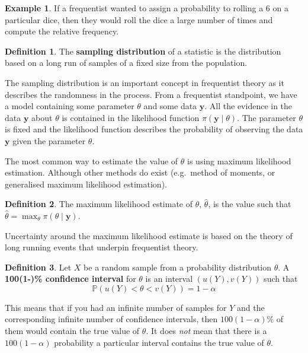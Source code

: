 \documentclass[
]{book}
\theoremstyle{definition}
\newtheorem{definition}{Definition}[chapter]
\theoremstyle{definition}
\newtheorem{example}{Example}[chapter]
\theoremstyle{definition}
\theoremstyle{definition}
\theoremstyle{remark}
\begin{document}
\begin{example}
If a frequentist wanted to assign a probability to rolling a 6 on a particular dice, then they would roll the dice a large number of times and compute the relative frequency.
\end{example}

\begin{definition}
The \textbf{sampling distribution} of a statistic is the distribution based on a long run of samples of a fixed size from the population.
\end{definition}

The sampling distribution is an important concept in frequentist theory as it describes the randomness in the process. From a frequentist standpoint, we have a model containing some parameter \(\theta\) and some data \(\boldsymbol{y}\). All the evidence in the data \(\boldsymbol{y}\) about \(\theta\) is contained in the likelihood function \(\pi(\boldsymbol{y} \mid \theta)\). The parameter \(\theta\) is fixed and the likelihood function describes the probability of observing the data \(\boldsymbol{y}\) given the parameter \(\theta\).

The most common way to estimate the value of \(\theta\) is using maximum likelihood estimation. Although other methods do exist (e.g.~method of moments, or generalised maximum likelihood estimation).

\begin{definition}
The maximum likelihood estimate of \(\theta\), \(\hat{\theta}\), is the value such that \(\hat{\theta} = \max_{\theta} \pi(\theta \mid \boldsymbol{y})\).
\end{definition}

Uncertainty around the maximum likelihood estimate is based on the theory of long running events that underpin frequentist theory.

\begin{definition}
Let \(X\) be a random sample from a probability distribution \(\theta\). A \textbf{100(1-\alpha)\% confidence interval} for \(\theta\) is an interval \((u(Y), v(Y))\) such that
\[
\mathbb{P}(u(Y) < \theta < v(Y)) = 1-\alpha
\]
\end{definition}

This means that if you had an infinite number of samples for \(Y\) and the corresponding infinite number of confidence intervals, then \(100(1-\alpha)\)\% of them would contain the true value of \(\theta\). It does \emph{not} mean that there is a \(100(1-\alpha)\) probability a particular interval contains the true value of \(\theta\).
\end{document}
